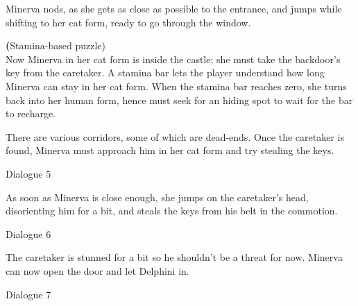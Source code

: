 Minerva nods, as she gets as close as possible to the entrance, and jumps while shifting to her cat form, ready to go through the window.

\textbf(Stamina-based puzzle) \\ 

Now Minerva in her cat form is inside the castle; she must take the backdoor's key from the caretaker. A stamina bar lets the player understand how long Minerva can stay in her cat form. When the stamina bar reaches zero, she turns back into her human form, hence must seek for an hiding spot to wait for the bar to recharge.

There are various corridors, some of which are dead-ends. Once the caretaker is found, Minerva must approach him in her cat form and try stealing the keys.


\begin{dialogue}{Dialogue 5} 
\end{dialogue} 


As soon as Minerva is close enough, she jumps on the caretaker's head, disorienting him for a bit, and steals the keys from his belt in the commotion.

\pagebreak

\begin{dialogue}{Dialogue 6} 
\end{dialogue} 

The caretaker is stunned for a bit so he shouldn't be a threat for now. Minerva can now open the door and let Delphini in.


\begin{dialogue}{Dialogue 7}
\end{dialogue} 

